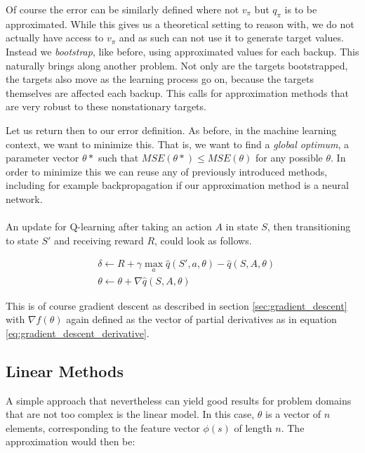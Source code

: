 Of course the error can be similarly defined
where not $v_\pi$ but $q_\pi$ is to be approximated.
While this gives us a theoretical setting to reason with,
we do not actually have access to $v_\pi$
and as such can not use it to generate target values.
Instead we \textit{bootstrap}, like before,
using approximated values for each backup.
This naturally brings along another problem.
Not only are the targets bootstrapped,
the targets also move as the learning process go on,
because the targets themselves are affected each backup.
This calls for approximation methods that
are very robust to these nonstationary targets.

Let us return then to our error definition.
As before, in the machine learning context,
we want to minimize this.
That is, we want to find a \textit{global optimum},
a parameter vector $\theta*$
such that $MSE(\theta*) \leq MSE(\theta)$ for any possible $\theta$.
In order to minimize this we can reuse any of previously introduced methods,
including for example backpropagation
if our approximation method is a neural network.

\paragraph{}
An update for Q-learning
after taking an action $A$ in state $S$,
then transitioning to state $S'$ and receiving reward $R$,
could look as follows.

\begin{align*}
  &\delta \gets R + \gamma \max_a \hat{q}(S', a, \theta) - \hat{q}(S, A, \theta) \\
  &\theta \gets \theta + \nabla \hat{q}(S, A, \theta)
\end{align*}

This is of course gradient descent
as described in section \ref{sec:gradient_descent}
with $\nabla f(\theta)$
again defined as the vector of partial derivatives
as in equation \ref{eq:gradient_descent_derivative}.

\subsection{Linear Methods}
\label{sub:linear_methods}
A simple approach that nevertheless can yield good results
for problem domains that are not too complex
is the linear model.
In this case, $\theta$ is a vector of $n$ elements,
corresponding to the feature vector $\phi(s)$ of length $n$.
The approximation would then be:

